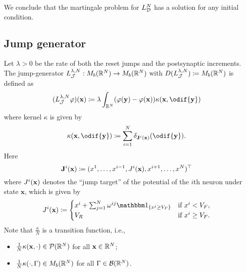 \smallskip

We conclude that the martingale problem for \(L_{\mathcal{D}}^N\) has a solution for any initial condition.


\subsection{Jump generator}
Let \(\lambda > 0\) be the rate of both the reset jumps and the postsynaptic increments.
The jump-generator \(L_{\mathcal{J}}^{\lambda, N} : M_b(\mathbb{R}^N) \to M_b(\mathbb{R}^N)\) with \( D( L_{\mathcal{J}}^{\lambda, N} ) \coloneqq M_b(\mathbb{R}^N) \) is defined as
\begin{equation}
  (L_{\cJ}^{\lambda, N}\varphi) (\bm{x}) \coloneqq \lambda \int_{\potspace^N} \br{\varphi(\bm{y}) - \varphi(\bm{x})} \kappa(\bm{x}, \odif{\bm{y}})
\end{equation}
where kernel \( \kappa \) is given by
\begin{equation}
  \kappa(\bm{x},\odif{\bm{y}}) \coloneqq \sum_{i=1}^N \delta_{\bm{\jtarg}^i(\bm{x})}(\odif{\bm{y}}).
\end{equation}
Here
\begin{equation}
  \mathbf{J}^i(\mathbf{x}) \coloneqq (x^1,\dots,x^{i-1},J^i(\mathbf{x}),x^{i+1},\dots,x^N)^\top
\end{equation}
where \(J^i(\mathbf{x})\) denotes the \enquote{jump target} of the potential of the \(i\)th neuron under state \(\bm{x}\), which is given by
\begin{equation}
  \jtarg^i(\bm{x})
  \coloneqq \begin{cases}
    x^i + \sum_{j=1}^N \omega^{ij} \ind{x^j \geq V_F} & \text{if } x^i < V_F,    \\
    V_R                                               & \text{if } x^i \geq V_F.
  \end{cases}
\end{equation}
Note that \(\frac{\kappa}{N}\) is a transition function, i.e.,
\begin{itemize}
  \item \(\frac{1}{N} \kappa(\mathbf{x},\cdot) \in \mathcal{P}(\mathbb{R}^N)\) for all \(\mathbf{x} \in \mathbb{R}^N\);
  \item \(\frac{1}{N} \kappa(\cdot, \Gamma) \in M_b(\mathbb{R}^N)\) for all \(\Gamma \in \mathcal{B}(\mathbb{R}^N)\).
\end{itemize}

